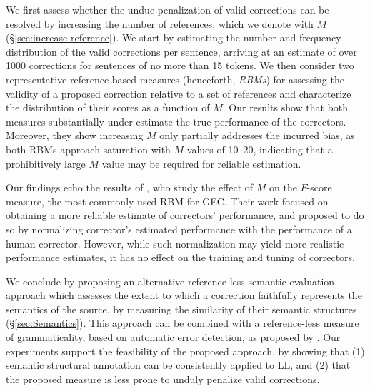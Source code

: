 \documentclass[letter,11pt]{article}
\begin{document}
We first assess whether the undue penalization of valid corrections can be resolved by increasing the number
of references, which we denote with $M$ (\S \ref{sec:increase-reference}).
We start by estimating the number and frequency distribution of the valid corrections per sentence,
arriving at an estimate of over 1000 corrections for sentences of no more than 15 tokens.
We then consider two representative reference-based measures (henceforth, {\it RBMs}) for
assessing the validity of a proposed correction relative to a set of references
and characterize the distribution of their scores as a function of $M$. 
Our results show that both measures substantially under-estimate the true performance of
the correctors. Moreover, they show increasing $M$ only partially addresses
the incurred bias, as both RBMs approach saturation with $M$ values of 10--20,
indicating that a prohibitively large $M$ value may be required for reliable estimation.

Our findings echo the results of , who study the effect of $M$
on the $F$-score measure, the most commonly used RBM for GEC. Their work focused on
obtaining a more reliable estimate of correctors' performance, and proposed to do so
by normalizing corrector's estimated performance with the performance of a human corrector. However, while such normalization may yield more realistic performance estimates,
it has no effect on the training and tuning of correctors.

We conclude by proposing an alternative reference-less semantic evaluation approach which assesses the extent to which
a correction faithfully represents the semantics of the source, by measuring the similarity of their semantic structures (\S \ref{sec:Semantics}).
This approach can be combined with a reference-less measure of grammaticality, based on automatic error detection, as
proposed by .
Our experiments support the feasibility of the proposed approach,
by showing that (1) semantic structural annotation can be consistently applied to LL, and (2) that the proposed measure is less prone to unduly penalize valid corrections.
%
%
%
%
\end{document}
